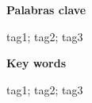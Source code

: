{\huge\bfseries \space Palabras clave}
\bigskip

tag1; tag2; tag3

\bigskip
\bigskip\bigskip
\bigskip
{\huge\bfseries \space Key words}
\bigskip

tag1; tag2; tag3%
